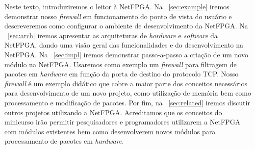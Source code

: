 Neste texto, introduziremos o leitor à NetFPGA. Na
\secstr~\ref{sec:example} iremos demonstrar nosso \emph{firewall} em
funcionamento do ponto de vista do usuário e descreveremos como
configurar o ambiente de desenvolvimento da NetFPGA.  Na
\secstr~\ref{sec:arch} iremos apresentar as arquiteturas de
\emph{hardware} e \emph{software} da NetFPGA, dando uma visão geral
das funcionalidades e do desenvolvimento na NetFPGA.  Na
\secstr~\ref{sec:impl} iremos demonstrar passo-a-passo a criação de
um novo módulo na NetFPGA.  Usaremos como exemplo um \emph{firewall}
para filtragem de pacotes em \emph{hardware} em função da porta de
destino do protocolo TCP.  Nosso \emph{firewall} é um exemplo
didático que cobre a maior parte dos conceitos necessários para
desenvolvimento de um novo projeto, como utilização de memória bem
como processamento e modificação de pacotes.  Por fim, na
\secstr~\ref{sec:related} iremos discutir outros projetos utilizando
a NetFPGA.  Acreditamos que os conceitos do minicurso irão permitir
pesquisadores e programadores utilizarem a NetFPGA com módulos
existentes bem como desenvolverem novos módulos para processamento
de pacotes em \emph{hardware}.

